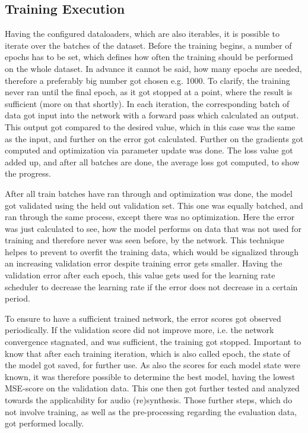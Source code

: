 \subsection{Training Execution}
Having the configured dataloaders, which are also iterables, it is possible to iterate over the batches of the dataset. Before the training begins, a number of epochs has to be set, which defines how often the training should be performed on the whole dataset. In advance it cannot be said, how many epochs are needed, therefore a preferably big number got chosen e.g. 1000. To clarify, the training never ran until the final epoch, as it got stopped at a point, where the result is sufficient (more on that shortly). In each iteration, the corresponding batch of data got input into the network with a forward pass which calculated an output. This output got compared to the desired value, which in this case was the same as the input, and further on the error got calculated. Further on the gradients got computed and optimization via parameter update was done. The loss value got added up, and after all batches are done, the average loss got computed, to show the progress. 

After all train batches have ran through and optimization was done, the model got validated using the held out validation set. This one was equally batched, and ran through the same process, except there was no optimization. Here the error was just calculated to see, how the model performs on data that was not used for training and therefore never was seen before, by the network. This technique helpes to prevent to overfit the training data, which would be signalized through an increasing validation error despite training error gets smaller. Having the validation error after each epoch, this value gets used for the learning rate scheduler to decrease the learning rate if the error does not decrease in a certain period. 

To ensure to have a sufficient trained network, the error scores got observed periodically. If the validation score did not improve more, i.e. the network convergence stagnated, and was sufficient, the training got stopped. Important to know that after each training iteration, which is also called epoch, the state of the model got saved, for further use. As also the scores for each model state were known, it was therefore possible to determine the best model, having the lowest MSE-score on the validation data. This one then got further tested and analyzed towards the applicability for audio (re)synthesis. Those further steps, which do not involve training, as well as the pre-processing regarding the evaluation data, got performed locally. 

